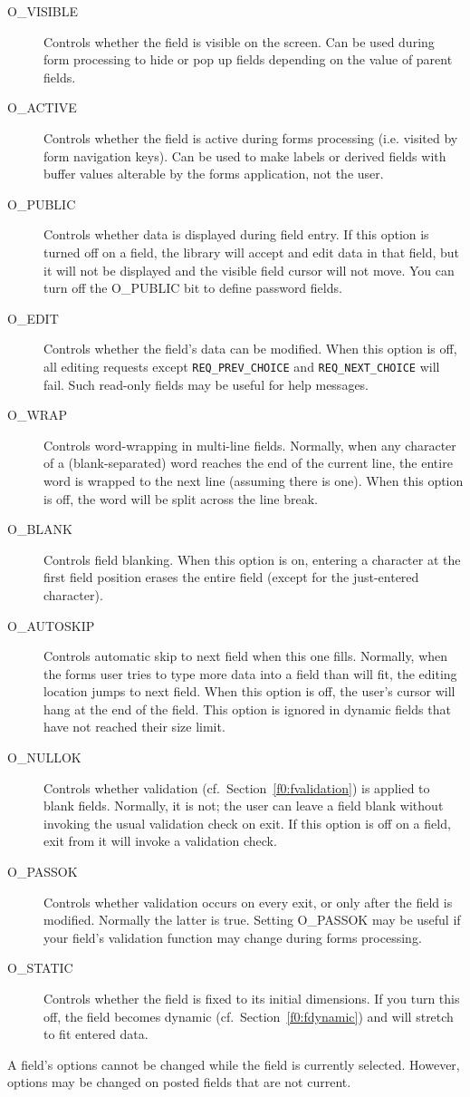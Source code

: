 \begin{description}
\item[ O\_VISIBLE]  Controls whether the field is visible on the screen.  Can be used
during form processing to hide or pop up fields depending on the value
of parent fields.
\item[ O\_ACTIVE]  Controls whether the field is active during forms processing (i.e.
visited by form navigation keys).  Can be used to make labels or derived
fields with buffer values alterable by the forms application, not the user.
\item[ O\_PUBLIC]  Controls whether data is displayed during field entry.  If this option is
turned off on a field, the library will accept and edit data in that field,
but it will not be displayed and the visible field cursor will not move.
You can turn off the O\_PUBLIC bit to define password fields.
\item[ O\_EDIT]  Controls whether the field's data can be modified.  When this option is
off, all editing requests except \texttt{REQ\_PREV\_CHOICE} and
\texttt{REQ\_NEXT\_CHOICE} will fail.  Such read-only fields may be useful for
help messages.
\item[ O\_WRAP]  Controls word-wrapping in multi-line fields.  Normally, when any
character of a (blank-separated) word reaches the end of the current line, the
entire word is wrapped to the next line (assuming there is one).  When this
option is off, the word will be split across the line break.
\item[ O\_BLANK]  Controls field blanking.  When this option is on, entering a character at
the first field position erases the entire field (except for the just-entered
character).
\item[ O\_AUTOSKIP]  Controls automatic skip to next field when this one fills.  Normally,
when the forms user tries to type more data into a field than will fit,
the editing location jumps to next field.  When this option is off, the
user's cursor will hang at the end of the field.  This option is ignored
in dynamic fields that have not reached their size limit.
\item[ O\_NULLOK]  Controls whether validation (cf.\ Section~\ref{f0:fvalidation}) is applied to
blank fields.  Normally, it is not; the user can leave a field blank
without invoking the usual validation check on exit.  If this option is
off on a field, exit from it will invoke a validation check.
\item[ O\_PASSOK]  Controls whether validation occurs on every exit, or only after
the field is modified.  Normally the latter is true.  Setting O\_PASSOK
may be useful if your field's validation function may change during
forms processing.
\item[ O\_STATIC]  Controls whether the field is fixed to its initial dimensions.  If you
turn this off, the field becomes dynamic (cf.\ Section~\ref{f0:fdynamic}) and will
stretch to fit entered data.
\end{description}
A field's options cannot be changed while the field is currently selected.
However, options may be changed on posted fields that are not current. 


